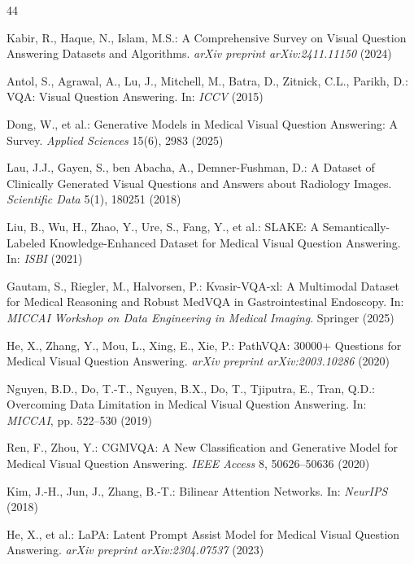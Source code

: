 \documentclass[9pt]{report}
\begin{document}
\begin{thebibliography}{44}

Kabir, R., Haque, N., Islam, M.S.: A Comprehensive Survey on Visual Question Answering Datasets and Algorithms. \textit{arXiv preprint arXiv:2411.11150} (2024)

Antol, S., Agrawal, A., Lu, J., Mitchell, M., Batra, D., Zitnick, C.L., Parikh, D.: VQA: Visual Question Answering. In: \textit{ICCV} (2015)

Dong, W., et al.: Generative Models in Medical Visual Question Answering: A Survey. \textit{Applied Sciences} 15(6), 2983 (2025)

Lau, J.J., Gayen, S., ben Abacha, A., Demner-Fushman, D.: A Dataset of Clinically Generated Visual Questions and Answers about Radiology Images. \textit{Scientific Data} 5(1), 180251 (2018)

Liu, B., Wu, H., Zhao, Y., Ure, S., Fang, Y., et al.: SLAKE: A Semantically-Labeled Knowledge-Enhanced Dataset for Medical Visual Question Answering. In: \textit{ISBI} (2021)

Gautam, S., Riegler, M., Halvorsen, P.: Kvasir-VQA-xl: A Multimodal Dataset for Medical Reasoning and Robust MedVQA in Gastrointestinal Endoscopy. In: \textit{MICCAI Workshop on Data Engineering in Medical Imaging}. Springer (2025)

He, X., Zhang, Y., Mou, L., Xing, E., Xie, P.: PathVQA: 30000+ Questions for Medical Visual Question Answering. \textit{arXiv preprint arXiv:2003.10286} (2020)

Nguyen, B.D., Do, T.-T., Nguyen, B.X., Do, T., Tjiputra, E., Tran, Q.D.: Overcoming Data Limitation in Medical Visual Question Answering. In: \textit{MICCAI}, pp. 522--530 (2019)

Ren, F., Zhou, Y.: CGMVQA: A New Classification and Generative Model for Medical Visual Question Answering. \textit{IEEE Access} 8, 50626--50636 (2020)

Kim, J.-H., Jun, J., Zhang, B.-T.: Bilinear Attention Networks. In: \textit{NeurIPS} (2018)

He, X., et al.: LaPA: Latent Prompt Assist Model for Medical Visual Question Answering. \textit{arXiv preprint arXiv:2304.07537} (2023)


\end{thebibliography}
\end{document}
